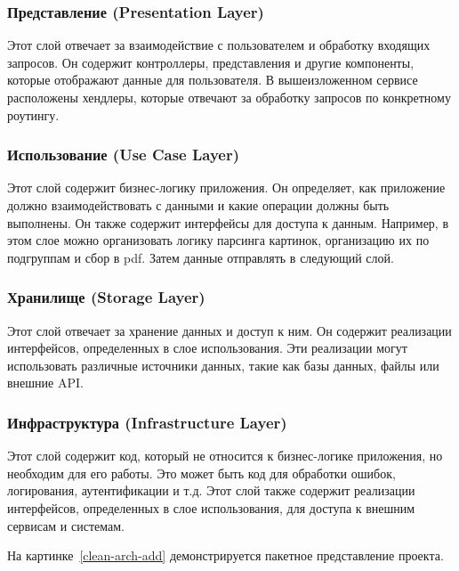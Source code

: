 \subsubsection{Представление (Presentation Layer)}
Этот слой отвечает за взаимодействие с пользователем и обработку входящих запросов.
Он содержит контроллеры, представления и другие компоненты, которые отображают данные для пользователя.
В вышеизложенном сервисе расположены хендлеры, которые отвечают за обработку запросов по конкретному роутингу.

\subsubsection{Использование (Use Case Layer)}
Этот слой содержит бизнес-логику приложения. 
Он определяет, как приложение должно взаимодействовать с данными и какие операции должны быть выполнены. 
Он также содержит интерфейсы для доступа к данным.
Например, в этом слое можно организовать логику парсинга картинок, организацию их по подгруппам и сбор в pdf.
Затем данные отправлять в следующий слой.

\subsubsection{Хранилище (Storage Layer)}
Этот слой отвечает за хранение данных и доступ к ним. 
Он содержит реализации интерфейсов, определенных в слое использования. 
Эти реализации могут использовать различные источники данных, такие как базы данных, файлы или внешние API.

\subsubsection{Инфраструктура (Infrastructure Layer)}
Этот слой содержит код, который не относится к бизнес-логике приложения, но необходим для его работы. 
Это может быть код для обработки ошибок, логирования, аутентификации и т.д. 
Этот слой также содержит реализации интерфейсов, определенных в слое использования, для доступа к внешним сервисам и системам.

На картинке~\ref{clean-arch-add} демонстрируется пакетное представление проекта.